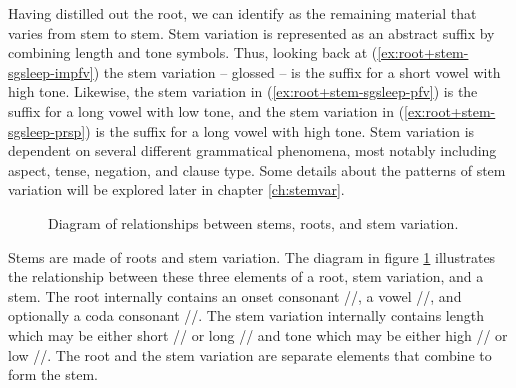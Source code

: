 Having distilled out the root, we can identify  as the remaining material that varies from stem to stem. Stem variation is represented as an abstract suffix by combining length and tone symbols. Thus, looking back at (\ref{ex:root+stem-sgsleep-impfv}) the stem variation – glossed  – is the suffix  for a short vowel with high tone. Likewise, the stem variation in (\ref{ex:root+stem-sgsleep-pfv}) is the suffix  for a long vowel with low tone, and the stem variation in (\ref{ex:root+stem-sgsleep-prsp}) is the suffix  for a long vowel with high tone. Stem variation is dependent on several different grammatical phenomena, most notably including aspect, tense, negation, and clause type. Some details about the patterns of stem variation will be explored later in chapter \ref{ch:stemvar}.

\begin{figure}
\centerfloat
{}
\caption{Diagram of relationships between stems, roots, and stem variation.}
\label{fig:root+stem-root-stem-and-variation}
\end{figure}

Stems are made of roots and stem variation. The diagram in figure \ref{fig:root+stem-root-stem-and-variation} illustrates the relationship between these three elements of a root, stem variation, and a stem. The root internally contains an onset consonant //, a vowel //, and optionally a coda consonant //. The stem variation internally contains length which may be either short // or long // and tone which may be either high // or low //. The root and the stem variation are separate elements that combine to form the stem.

